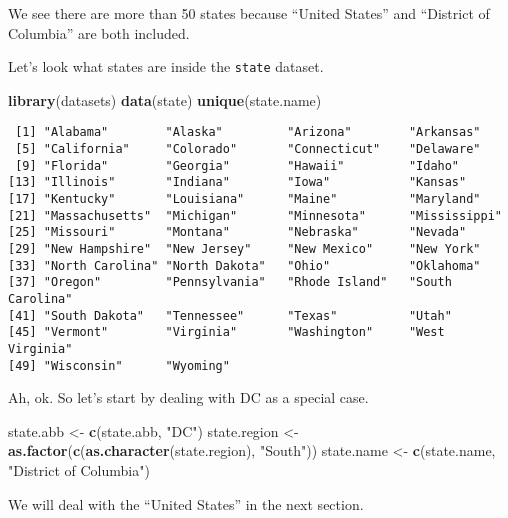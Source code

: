 \documentclass[]{article}
\newenvironment{Shaded}{\begin{snugshade}}{\end{snugshade}}
\newcommand{\KeywordTok}[1]{\textcolor[rgb]{0.13,0.29,0.53}{\textbf{#1}}}
\newcommand{\NormalTok}[1]{#1}
\newcommand{\StringTok}[1]{\textcolor[rgb]{0.31,0.60,0.02}{#1}}
\begin{document}
We see there are more than 50 states because ``United States'' and
``District of Columbia'' are both included.

Let's look what states are inside the \texttt{state} dataset.

\begin{Shaded}
\begin{Highlighting}[]
\KeywordTok{library}\NormalTok{(datasets)}
\KeywordTok{data}\NormalTok{(state)}
\KeywordTok{unique}\NormalTok{(state.name)}
\end{Highlighting}
\end{Shaded}

\begin{verbatim}
 [1] "Alabama"        "Alaska"         "Arizona"        "Arkansas"      
 [5] "California"     "Colorado"       "Connecticut"    "Delaware"      
 [9] "Florida"        "Georgia"        "Hawaii"         "Idaho"         
[13] "Illinois"       "Indiana"        "Iowa"           "Kansas"        
[17] "Kentucky"       "Louisiana"      "Maine"          "Maryland"      
[21] "Massachusetts"  "Michigan"       "Minnesota"      "Mississippi"   
[25] "Missouri"       "Montana"        "Nebraska"       "Nevada"        
[29] "New Hampshire"  "New Jersey"     "New Mexico"     "New York"      
[33] "North Carolina" "North Dakota"   "Ohio"           "Oklahoma"      
[37] "Oregon"         "Pennsylvania"   "Rhode Island"   "South Carolina"
[41] "South Dakota"   "Tennessee"      "Texas"          "Utah"          
[45] "Vermont"        "Virginia"       "Washington"     "West Virginia" 
[49] "Wisconsin"      "Wyoming"       
\end{verbatim}

Ah, ok. So let's start by dealing with DC as a special case.

\begin{Shaded}
\begin{Highlighting}[]
\NormalTok{state.abb <-}\StringTok{ }\KeywordTok{c}\NormalTok{(state.abb, }\StringTok{"DC"}\NormalTok{)}
\NormalTok{state.region <-}\StringTok{ }\KeywordTok{as.factor}\NormalTok{(}\KeywordTok{c}\NormalTok{(}\KeywordTok{as.character}\NormalTok{(state.region), }\StringTok{"South"}\NormalTok{))}
\NormalTok{state.name <-}\StringTok{ }\KeywordTok{c}\NormalTok{(state.name, }\StringTok{"District of Columbia"}\NormalTok{)}
\end{Highlighting}
\end{Shaded}

We will deal with the ``United States'' in the next section.
\end{document}
